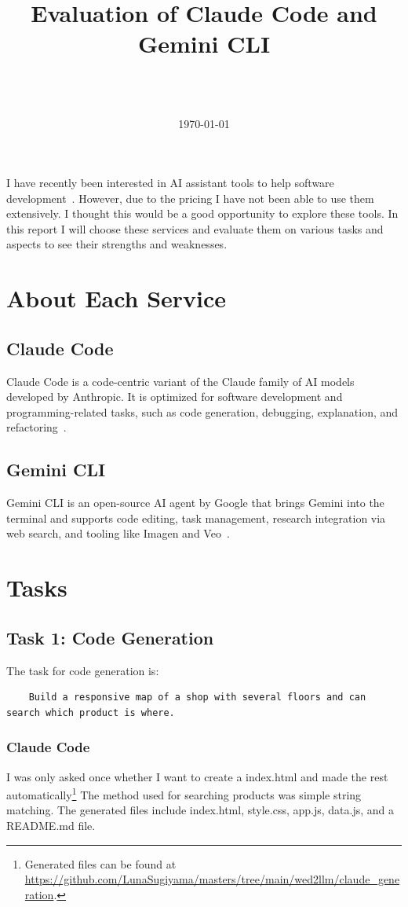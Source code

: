 \documentclass[9.5pt]{article}
\title{\textbf{Evaluation of Claude Code and Gemini CLI}}
\author{
    \makebox[\textwidth][c]{\textbf{Luna Sugiyama}} \\
    \makebox[\textwidth][c]{Information and Communication Engineering} \\
    \makebox[\textwidth][c]{\texttt{lunagracesugiyama@g.ecc.u-tokyo.ac.jp}}
}
\date{\today}
\begin{document}
\maketitle
\thispagestyle{fancy}
I have recently been interested in AI assistant tools to help software development~\cite{vibecoding}.
However, due to the pricing I have not been able to use them extensively.
I thought this would be a good opportunity to explore these tools.
In this report I will choose these services and evaluate them on various tasks and aspects to see their strengths and weaknesses.

\section{About Each Service}
\subsection{Claude Code}
Claude Code is a code-centric variant of the Claude family of AI models developed by Anthropic. It is optimized for software development and programming-related tasks, such as code generation, debugging, explanation, and refactoring~\cite{anthropic_claudecode}.
\subsection{Gemini CLI}
Gemini CLI is an open-source AI agent by Google that brings Gemini into the terminal and supports code editing, task management, research integration via web search, and tooling like Imagen and Veo~\cite{google_gemini_cli}.

\section{Tasks}
\subsection{Task 1: Code Generation}
The task for code generation is:
\begin{verbatim}
    Build a responsive map of a shop with several floors and can search which product is where.
\end{verbatim}
\subsubsection{Claude Code}
I was only asked once whether I want to create a index.html and made the rest automatically\footnote{Generated files can be found at \url{https://github.com/LunaSugiyama/masters/tree/main/wed2llm/claude_generation}.}
The method used for searching products was simple string matching.
The generated files include index.html, style.css, app.js, data.js, and a README.md file.
\end{document}

